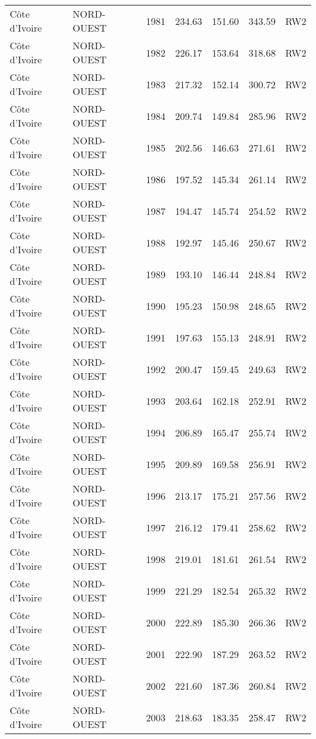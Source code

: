 \begin{longtable}{lllrrrl}
  C\^{o}te d'Ivoire & NORD-OUEST & 1981 & 234.63 & 151.60 & 343.59 & RW2 \\ 
  C\^{o}te d'Ivoire & NORD-OUEST & 1982 & 226.17 & 153.64 & 318.68 & RW2 \\ 
  C\^{o}te d'Ivoire & NORD-OUEST & 1983 & 217.32 & 152.14 & 300.72 & RW2 \\ 
  C\^{o}te d'Ivoire & NORD-OUEST & 1984 & 209.74 & 149.84 & 285.96 & RW2 \\ 
  C\^{o}te d'Ivoire & NORD-OUEST & 1985 & 202.56 & 146.63 & 271.61 & RW2 \\ 
  C\^{o}te d'Ivoire & NORD-OUEST & 1986 & 197.52 & 145.34 & 261.14 & RW2 \\ 
  C\^{o}te d'Ivoire & NORD-OUEST & 1987 & 194.47 & 145.74 & 254.52 & RW2 \\ 
  C\^{o}te d'Ivoire & NORD-OUEST & 1988 & 192.97 & 145.46 & 250.67 & RW2 \\ 
  C\^{o}te d'Ivoire & NORD-OUEST & 1989 & 193.10 & 146.44 & 248.84 & RW2 \\ 
  C\^{o}te d'Ivoire & NORD-OUEST & 1990 & 195.23 & 150.98 & 248.65 & RW2 \\ 
  C\^{o}te d'Ivoire & NORD-OUEST & 1991 & 197.63 & 155.13 & 248.91 & RW2 \\ 
  C\^{o}te d'Ivoire & NORD-OUEST & 1992 & 200.47 & 159.45 & 249.63 & RW2 \\ 
  C\^{o}te d'Ivoire & NORD-OUEST & 1993 & 203.64 & 162.18 & 252.91 & RW2 \\ 
  C\^{o}te d'Ivoire & NORD-OUEST & 1994 & 206.89 & 165.47 & 255.74 & RW2 \\ 
  C\^{o}te d'Ivoire & NORD-OUEST & 1995 & 209.89 & 169.58 & 256.91 & RW2 \\ 
  C\^{o}te d'Ivoire & NORD-OUEST & 1996 & 213.17 & 175.21 & 257.56 & RW2 \\ 
  C\^{o}te d'Ivoire & NORD-OUEST & 1997 & 216.12 & 179.41 & 258.62 & RW2 \\ 
  C\^{o}te d'Ivoire & NORD-OUEST & 1998 & 219.01 & 181.61 & 261.54 & RW2 \\ 
  C\^{o}te d'Ivoire & NORD-OUEST & 1999 & 221.29 & 182.54 & 265.32 & RW2 \\ 
  C\^{o}te d'Ivoire & NORD-OUEST & 2000 & 222.89 & 185.30 & 266.36 & RW2 \\ 
  C\^{o}te d'Ivoire & NORD-OUEST & 2001 & 222.90 & 187.29 & 263.52 & RW2 \\ 
  C\^{o}te d'Ivoire & NORD-OUEST & 2002 & 221.60 & 187.36 & 260.84 & RW2 \\ 
  C\^{o}te d'Ivoire & NORD-OUEST & 2003 & 218.63 & 183.35 & 258.47 & RW2 \\ 

\end{longtable}
